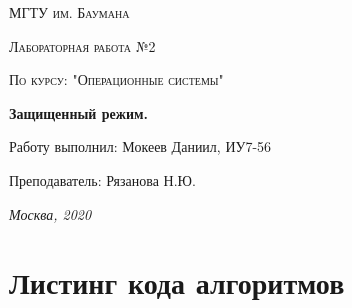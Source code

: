 \documentclass[12pt]{report}
\begin{document}
\begin{titlepage}
	\centering
	{\scshape\LARGE МГТУ им. Баумана \par}
	\vspace{3cm}
	{\scshape\Large Лабораторная работа №2\par}
	\vspace{0.5cm}	
	{\scshape\Large По курсу: "Операционные системы"\par}
	\vspace{1.5cm}
	\centering
	 {\huge\bfseries Защищенный режим.\par}
	\vspace{2cm}
	\Large Работу выполнил: Мокеев Даниил, ИУ7-56\par
	\vspace{0.5cm}
	\Large Преподаватель:  Рязанова Н.Ю.\par

	\vfill
	\large \textit {Москва, 2020} \par
\end{titlepage}


\newpage

\chapter{Листинг кода алгоритмов}
\end{document}
